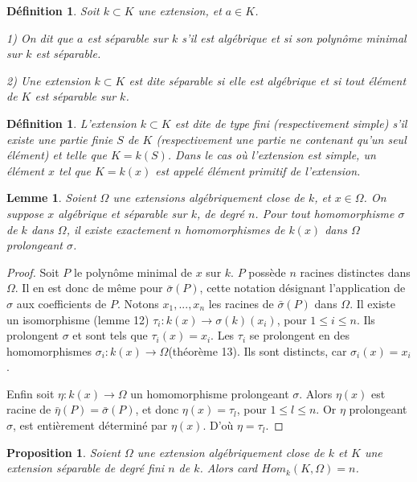 \documentclass[12pt,a4paper]{report}
\newtheorem{lem}[thm]{\bf Lemme}
\newtheorem{prop}[thm]{\bf Proposition}
\newtheorem{defn}[thm]{\bf D\'efinition}
\begin{document}
\begin{defn}\rm 
Soit $k\subset K$ une extension, et $a \in K$. 

1) On dit que $a$ est séparable sur $k$ s'il est algébrique et si son polynôme minimal sur $k$ est séparable. 

2) Une extension $k \subset K$ est dite séparable si elle est algébrique et si tout élément de $K$ est séparable sur $k$.  

\end{defn}

\begin{defn}\rm
L'extension $k \subset K$ est dite de type fini (respectivement simple) s'il existe une partie finie $S$ de $K$ (respectivement une partie ne contenant qu'un seul élément) et telle que $K=k(S)$. Dans le cas où l'extension est simple, un élément $x$ tel que $K=k(x)$ est appelé élément primitif de l'extension. 

\end{defn}

\begin{lem}\rm
Soient $\Omega$ une extensions algébriquement close de $k$, et $x\in \Omega$. On suppose $x$ algébrique et séparable sur $k$, de degré $n$. Pour tout homomorphisme $\sigma$ de $k$ dans $\Omega$, il existe exactement $n$ homomorphismes de $k(x)$ dans $\Omega$ prolongeant $\sigma$. 

\end{lem}
\begin{proof}
Soit $P$ le polynôme minimal de $x$ sur $k$. $P$ possède $n$ racines distinctes dans $\Omega$. Il en est donc de même pour $\bar{\sigma}(P)$, cette notation désignant l'application de $\sigma$ aux coefficients de $P$. Notons $x_1,...,x_n$ les racines de $\bar{\sigma}(P)$ dans $\Omega$. Il existe un isomorphisme (lemme 12) $\tau_i : k(x) \rightarrow \sigma(k)(x_i)$, pour $1\leq i \leq n$. Ils prolongent $\sigma$ et sont tels que $\tau_i(x)=x_i$. Les $\tau_i$ se prolongent en des homomorphismes $\sigma_i : k(x) \rightarrow \Omega$(théorème 13). Ils sont distincts, car $\sigma_i(x)=x_i$.

Enfin soit $\eta : k(x)\rightarrow \Omega$ un homomorphisme prolongeant $\sigma$. Alors $\eta(x)$ est racine de $\bar{\eta}(P)=\bar{\sigma}(P)$, et donc $\eta(x)=\tau_l$, pour $1\leq l\leq n $. Or $\eta$ prolongeant $\sigma$, est entièrement déterminé par $\eta(x)$. D'où $\eta=\tau_l$. 
\end{proof}

\begin{prop}\rm
Soient $\Omega$ une extension algébriquement close de $k$ et $K$ une extension séparable de degré fini $n$ de $k$. Alors card $Hom_k(K,\Omega)=n$.

\end{prop}
\end{document}
